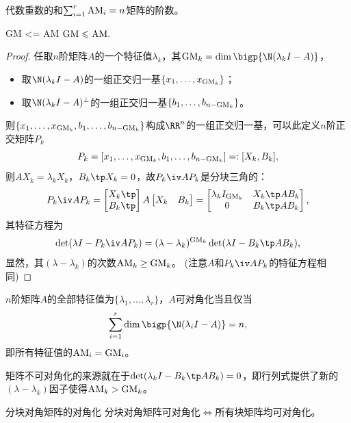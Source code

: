\begin{corollary}
	代数重数的和$\textstyle\sum_{i=1}^r\mathrm{AM}_i=n$矩阵的阶数。
\end{corollary}

\begin{theorem}{}{GM <= AM}
	$\mathrm{GM}\leqslant\mathrm{AM}.$
\end{theorem}
\begin{proof}
	任取$n$阶矩阵$A$的一个特征值$\lambda_k$，其$\GM_k=\dim\bigp{\N(\lambda_kI-A)}$，
	\begin{itemize}
		\item 取$\N(\lambda_kI-A)$的一组正交归一基$\{x_1,\ldots,x_{\mathrm{GM}_k}\}$；
		\item 取$\N(\lambda_kI-A)^\perp$的一组正交归一基$\{b_1,\ldots,b_{n-\mathrm{GM}_k}\}$。
	\end{itemize}
	则$\{x_1,\ldots,x_{\mathrm{GM}_k},b_1,\ldots,b_{n-\mathrm{GM}_k}\}$构成$\RR^n$的一组正交归一基，可以此定义$n$阶正交矩阵$P_k$ 
	\[
		P_k=[x_1,\ldots,x_{\mathrm{GM}_k},b_1,\ldots,b_{n-\mathrm{GM}_k}]=:[X_k,B_k],
	\]
	则$AX_k=\lambda_kX_k$，$B_k\tp X_k=0$，故$P_k\iv AP_k$是分块三角的：
	\[
		P_k\iv AP_k=\begin{bmatrix}
			X_k\tp\\B_k\tp
		\end{bmatrix}A\begin{bmatrix}
			X_k&B_k
		\end{bmatrix}=\begin{bmatrix}
			\lambda_kI_{\GM_k}&X_k\tp AB_k\\0&B_k\tp AB_k
		\end{bmatrix},
	\]
	其特征方程为
	\[
		\det(\lambda I-P_k\iv AP_k)=(\lambda-\lambda_k)^{\GM_k}\det(\lambda I-B_k\tp AB_k),
	\]
	显然，其$(\lambda-\lambda_k)$的次数$\mathrm{AM}_k\geq\mathrm{GM}_k$。
	(注意$A$和$P_k\iv AP_k$的特征方程相同)
\end{proof}

\begin{corollary}
	$n$阶矩阵$A$的全部特征值为$\{\lambda_1,\ldots,\lambda_r\}$，$A$可对角化当且仅当
	\[
		\sum_{i=1}^r\dim\bigp{\N(\lambda_iI-A)}=n,
	\]
	即所有特征值的$\mathrm{AM}_i=\mathrm{GM}_i$。
\end{corollary}

\begin{corollary}
	矩阵不可对角化的来源就在于$\det(\lambda_kI-B_k\tp AB_k)=0$，即行列式提供了新的$(\lambda-\lambda_k)$因子使得$\mathrm{AM}_k>\mathrm{GM}_k$。
\end{corollary}

\begin{theorem}
	{分块对角矩阵的对角化}{}
	分块对角矩阵可对角化$\iff$所有块矩阵均可对角化。
\end{theorem}

